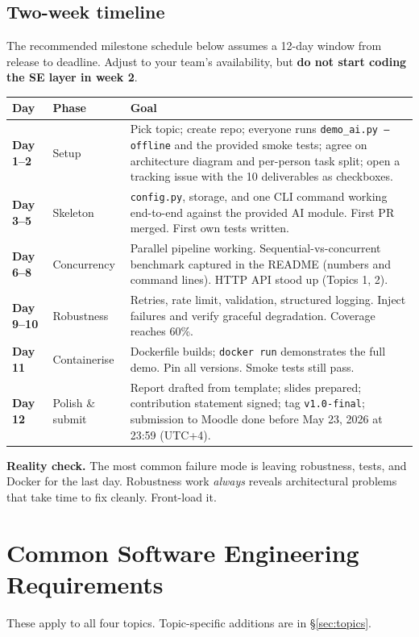 \documentclass[11pt,a4paper]{article}
\newcommand{\duedate}{May 23, 2026 at 23:59 (UTC+4)}
\newcommand{\warn}[1]{\textcolor{accent2}{\textbf{#1}}}
\begin{document}
\subsection{Two-week timeline}\label{sec:timeline}
The recommended milestone schedule below assumes a 12-day window from release to deadline. Adjust to your team's availability, but \warn{do not start coding the SE layer in week 2}.

\begin{center}\small
\begin{tabular}{>{\bfseries}p{2.3cm} p{2.6cm} p{9.5cm}}
\toprule
Day & Phase & Goal\\
\midrule
Day 1--2 & Setup & Pick topic; create repo; everyone runs \texttt{demo\_ai.py --offline} and the provided smoke tests; agree on architecture diagram and per-person task split; open a tracking issue with the 10 deliverables as checkboxes.\\[2pt]
Day 3--5 & Skeleton & \texttt{config.py}, storage, and one CLI command working end-to-end against the provided AI module. First PR merged. First own tests written.\\[2pt]
Day 6--8 & Concurrency & Parallel pipeline working. Sequential-vs-concurrent benchmark captured in the README (numbers and command lines). HTTP API stood up (Topics 1, 2).\\[2pt]
Day 9--10 & Robustness & Retries, rate limit, validation, structured logging. Inject failures and verify graceful degradation. Coverage reaches 60\%.\\[2pt]
Day 11 & Containerise & Dockerfile builds; \texttt{docker run} demonstrates the full demo. Pin all versions. Smoke tests still pass.\\[2pt]
Day 12 & Polish \& submit & Report drafted from template; slides prepared; contribution statement signed; tag \texttt{v1.0-final}; submission to Moodle done before \duedate.\\
\bottomrule
\end{tabular}
\end{center}

\warn{Reality check.} The most common failure mode is leaving robustness, tests, and Docker for the last day. Robustness work \emph{always} reveals architectural problems that take time to fix cleanly. Front-load it.

\section{Common Software Engineering Requirements}\label{sec:common}
These apply to all four topics. Topic-specific additions are in §\ref{sec:topics}.
\end{document}
